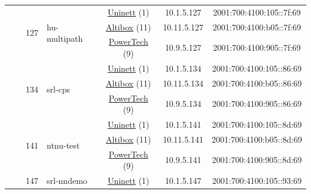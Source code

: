 \begin{small}
\begin{center}
\begin{longtable}{|c|c|c|c|c|c|c|c|}
  &  & \multirow{3}{*}{\tiny{127}} & \multicolumn{1}{|l|}{\multirow{3}{*}{\tiny{hu-multipath}}} & \multicolumn{2}{|c|}{\tiny{\href{https://www.uninett.no}{Uninett} (1)}} & \tiny{10.1.5.127} & \tiny{2001:700:4100:105::7f:69} \\* \cline{5-5}\cline{6-6}\cline{7-7}\cline{8-8}
  &  &  &  & \multicolumn{2}{|c|}{\tiny{\href{https://www.altibox.no}{Altibox} (11)}} & \tiny{10.11.5.127} & \tiny{2001:700:4100:b05::7f:69} \\* \cline{5-5}\cline{6-6}\cline{7-7}\cline{8-8}
  &  &  &  & \multicolumn{2}{|c|}{\tiny{\href{http://www.powertech.no}{PowerTech} (9)}} & \tiny{10.9.5.127} & \tiny{2001:700:4100:905::7f:69} \\* \cline{3-3}\cline{4-4}\cline{5-5}\cline{6-6}\cline{7-7}\cline{8-8}
  &  & \multirow{3}{*}{\tiny{134}} & \multicolumn{1}{|l|}{\multirow{3}{*}{\tiny{srl-cps}}} & \multicolumn{2}{|c|}{\tiny{\href{https://www.uninett.no}{Uninett} (1)}} & \tiny{10.1.5.134} & \tiny{2001:700:4100:105::86:69} \\* \cline{5-5}\cline{6-6}\cline{7-7}\cline{8-8}
  &  &  &  & \multicolumn{2}{|c|}{\tiny{\href{https://www.altibox.no}{Altibox} (11)}} & \tiny{10.11.5.134} & \tiny{2001:700:4100:b05::86:69} \\* \cline{5-5}\cline{6-6}\cline{7-7}\cline{8-8}
  &  &  &  & \multicolumn{2}{|c|}{\tiny{\href{http://www.powertech.no}{PowerTech} (9)}} & \tiny{10.9.5.134} & \tiny{2001:700:4100:905::86:69} \\* \cline{3-3}\cline{4-4}\cline{5-5}\cline{6-6}\cline{7-7}\cline{8-8}
  &  & \multirow{3}{*}{\tiny{141}} & \multicolumn{1}{|l|}{\multirow{3}{*}{\tiny{ntnu-test}}} & \multicolumn{2}{|c|}{\tiny{\href{https://www.uninett.no}{Uninett} (1)}} & \tiny{10.1.5.141} & \tiny{2001:700:4100:105::8d:69} \\* \cline{5-5}\cline{6-6}\cline{7-7}\cline{8-8}
  &  &  &  & \multicolumn{2}{|c|}{\tiny{\href{https://www.altibox.no}{Altibox} (11)}} & \tiny{10.11.5.141} & \tiny{2001:700:4100:b05::8d:69} \\* \cline{5-5}\cline{6-6}\cline{7-7}\cline{8-8}
  &  &  &  & \multicolumn{2}{|c|}{\tiny{\href{http://www.powertech.no}{PowerTech} (9)}} & \tiny{10.9.5.141} & \tiny{2001:700:4100:905::8d:69} \\* \cline{3-3}\cline{4-4}\cline{5-5}\cline{6-6}\cline{7-7}\cline{8-8}
  &  & \multirow{3}{*}{\tiny{147}} & \multicolumn{1}{|l|}{\multirow{3}{*}{\tiny{srl-nndemo}}} & \multicolumn{2}{|c|}{\tiny{\href{https://www.uninett.no}{Uninett} (1)}} & \tiny{10.1.5.147} & \tiny{2001:700:4100:105::93:69} \\* \cline{5-5}\cline{6-6}\cline{7-7}\cline{8-8}

\end{longtable}
\end{center}
\end{small}
